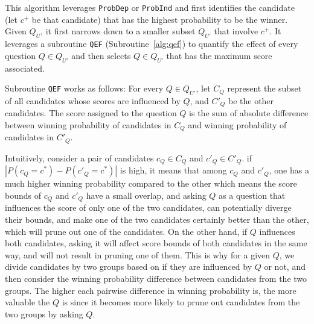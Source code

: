  This algorithm leverages {\tt ProbDep} or {\tt ProbInd} and first identifies the candidate (let $c^+$ be that candidate) that has the  highest probability to be the winner. Given $Q_U$, it first narrows down to a smaller subset $Q_{U'}$ that involve  $c^+$. It leverages a subroutine {\tt QEF} (Subroutine~\ref{alg:qef}) to quantify the effect of every question $Q \in Q_{U'}$ and then selects $Q \in Q_{U'}$ that has the maximum score associated.

Subroutine {\tt QEF} works as follows: For every $Q \in Q_{U'}$, let $C_Q$ represent the subset of all candidates whose scores are influenced by $Q$, and $C'_Q$ be the other candidates. The score assigned to the question $Q$ is the sum of absolute difference between winning probability of candidates in $C_Q$ and winning probability of candidates in $C'_Q$. 

Intuitively, consider a pair of candidates $c_Q \in C_Q$ and $c'_Q \in C'_Q$. if $|P(c_Q = c^*) - P(c'_Q = c^*)|$ is high, it means that among $c_Q$ and $c'_Q$, one has a much higher winning probability compared to the other which means the score bounds of $c_Q$ and $c'_Q$ have a small overlap, and asking $Q$ as a question that influences the score of only one of the two candidates, can potentially diverge their bounds, and make one of the two candidates certainly better than the other, which will prune out one of the candidates. On the other hand, if $Q$ influences both candidates, asking it will affect score bounds of both candidates in the same way, and will not result in pruning one of them. This is why for a given $Q$, we divide candidates by two groups based on if they are influenced by $Q$ or not, and then consider the winning probability difference between candidates from the two groups. The higher each pairwise difference in winning probability is, the more valuable the $Q$ is since it becomes more likely to prune out candidates from the two groups by asking $Q$. 

